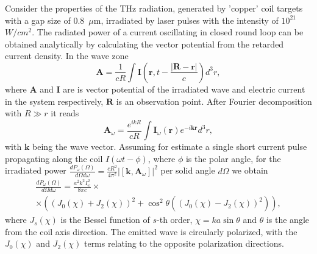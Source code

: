 \documentclass[aps,prl,twocolumn,superscriptaddress]{revtex4-1}
\begin{document}
Consider the properties of the THz radiation, generated by 'copper' coil targets with a gap size of $0.8$~$\mu$m, irradiated by laser pulses with the intensity of $10^{21}$~$W/cm^2$. The radiated power of a current oscillating in closed round loop can be obtained analytically by calculating the vector potential from the retarded current density. In the wave zone 
\begin{equation}
    \mathbf{A}=\frac{1}{cR}\int\mathbf{I}\left(\mathbf{r},t-\frac{|\mathbf{R}-\mathbf{r}|}{c}\right)d^3r,
    \label{A_init}
\end{equation}
where $\mathbf A$ and $\mathbf I$ are is vector potential of the irradiated wave and electric current in the system respectively, $\mathbf R$ is an observation point. After Fourier decomposition with $R\gg r$ it reads 
\begin{equation}
    \mathbf{A}_\omega=\frac{e^{i k R}}{cR}\int\mathbf{I}_\omega\left(\mathbf{r}\right) e^{-i \mathbf k \mathbf r} d^3r,
    \label{A_omega}
\end{equation}
with $\mathbf k$ being the wave vector. Assuming for estimate a single short current pulse propagating along the coil $I(\omega t - \phi)$, where $\phi$ is the polar angle, for the irradiated power $\frac{d P_\omega(\Omega)}{d\Omega d\omega} =\frac{cR^2}{4\pi^2}\vert \left[\mathbf k,\mathbf A_\omega \right] \vert^2$ per solid angle $d\Omega$ we obtain
\begin{multline}
    \frac{d P_\omega(\Omega)}{d\Omega d\omega} =  \frac{a^2k^2 I_\omega^2}{8 \pi c} \times \\
    \times \left(\left(J_0(\chi)+J_2(\chi)\right)^2+\cos^2\theta (\left(J_0(\chi)-J_2(\chi)\right)^2) \right),
    \label{power}
\end{multline}
where $J_s(\chi)$ is the Bessel function of $s$-th order, $\chi = ka\sin\theta$ and $\theta$ is the angle from the coil axis direction. The emitted wave is circularly polarized, with the $J_0(\chi)$ and $J_2(\chi)$ terms relating to the opposite polarization directions.
\end{document}
